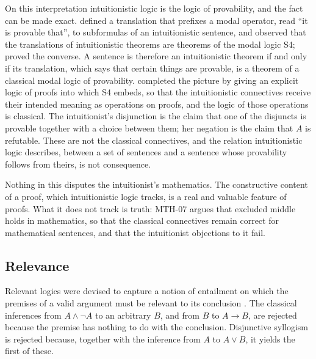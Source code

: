 \documentclass{situationist-preprint}
\begin{document}
On this interpretation intuitionistic logic is the logic of provability, and the fact can be made exact. \citet{Goedel1933} defined a translation that prefixes a modal operator, read \enquote{it is provable that}, to subformulas of an intuitionistic sentence, and observed that the translations of intuitionistic theorems are theorems of the modal logic S4; \citet{McKinseyTarski1948} proved the converse. A sentence is therefore an intuitionistic theorem if and only if its translation, which says that certain things are provable, is a theorem of a classical modal logic of provability. \citet{Artemov2001} completed the picture by giving an explicit logic of proofs into which S4 embeds, so that the intuitionistic connectives receive their intended meaning as operations on proofs, and the logic of those operations is classical. The intuitionist's disjunction is the claim that one of the disjuncts is provable together with a choice between them; her negation is the claim that $A$ is refutable. These are not the classical connectives, and the relation intuitionistic logic describes, between a set of sentences and a sentence whose provability follows from theirs, is not consequence.

Nothing in this disputes the intuitionist's mathematics. The constructive content of a proof, which intuitionistic logic tracks, is a real and valuable feature of proofs. What it does not track is truth: MTH-07 argues that excluded middle holds in mathematics, so that the classical connectives remain correct for mathematical sentences, and that the intuitionist objections to it fail.

\subsection{Relevance}

Relevant logics were devised to capture a notion of entailment on which the premises of a valid argument must be relevant to its conclusion \citep{AndersonBelnap1975}. The classical inferences from $A \wedge \neg A$ to an arbitrary $B$, and from $B$ to $A \to B$, are rejected because the premise has nothing to do with the conclusion. Disjunctive syllogism is rejected because, together with the inference from $A$ to $A \vee B$, it yields the first of these.
\end{document}
